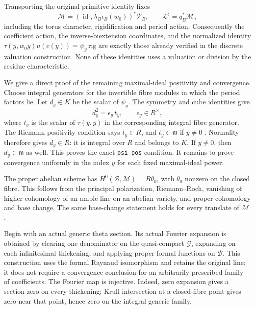 Transporting the original primitive identity fixes
\[
 \mathscr M=(\operatorname{id},\lambda_B\iota_B(w_0))^*\mathcal P_B,
 \qquad \mathscr L^\natural=q_B^*\mathscr M,
\]
including the torus character, rigidification and period action.
Consequently the coefficient action, the inverse-biextension
coordinates, and the normalized identity
$\tau(y,w_0y)u(c(y))=\psi_y\,\mathrm{rig}$ are exactly those
already verified in the discrete valuation construction.  None of
these identities uses a valuation or division by the residue
characteristic.

We give a direct proof of the remaining maximal-ideal positivity and
convergence.  Choose integral generators for the invertible fibre
modules in which the period factors lie.  Let $d_y\in K$ be the
scalar of $\psi_y$.  The symmetry and cube identities give
\[
              d_y^2=\epsilon_y\,t_y,\qquad
              \epsilon_y\in R^\times,
\]
where $t_y$ is the scalar of $\tau(y,y)$ in the corresponding
integral fibre generator.  The Riemann positivity condition says
$t_y\in R$, and $t_y\in\mathfrak m$ if $y\ne0$
\cite[Definition 4.2.1.10]{integral-theta-lan}.
Normality therefore gives $d_y\in R$: it is integral over $R$ and
belongs to $K$.  If $y\ne0$, then $d_y\in\mathfrak m$ as well.
This proves the exact \texttt{psi\_pos} condition.  It remains to
prove convergence uniformly in the index $y$ for each fixed
maximal-ideal power.

The proper abelian scheme has
$H^0(\mathcal B,\mathscr M)=R\theta_0$, with $\theta_0$ nonzero
on the closed fibre.  This follows from the principal polarization,
Riemann--Roch, vanishing of higher cohomology of an ample line on an
abelian variety, and proper cohomology and base change.  The same
base-change statement holds for every translate of $\mathscr M$.

Begin with an actual generic theta section.  Its actual Fourier
expansion is obtained by clearing one denominator on the
quasi-compact $\mathcal G$, expanding on each infinitesimal
thickening, and applying proper formal functions on $\mathcal B$.
This construction uses the formal Raynaud isomorphism and retains
the original line; it does not require a convergence conclusion
for an arbitrarily prescribed family of coefficients.  The Fourier
map is injective.  Indeed, zero expansion gives a section zero on
every thickening; Krull intersection at a closed-fibre point gives
zero near that point, hence zero on the integral generic family.

